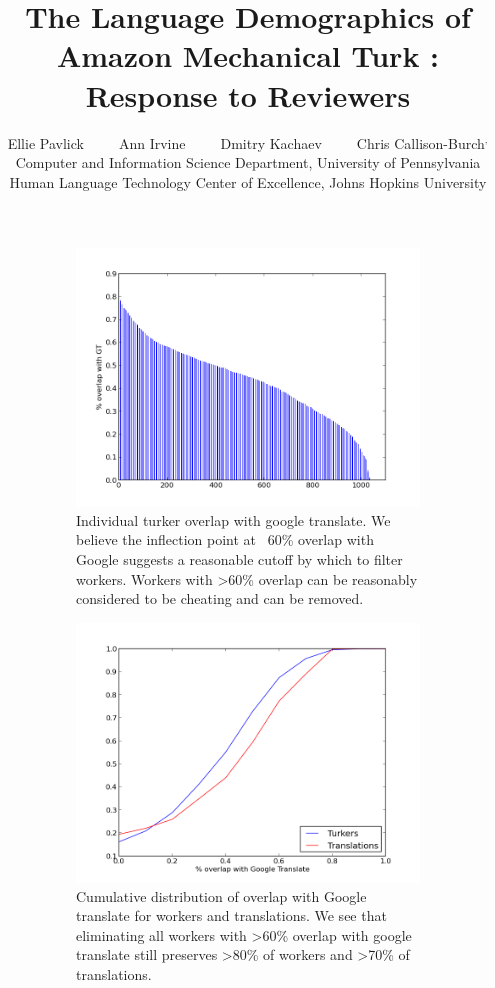 \documentclass[11pt]{article}
\title{The Language Demographics of  Amazon Mechanical Turk : Response  to Reviewers}
\author{Ellie Pavlick\affliationPenn \ \ \ \ \ Ann Irvine\affliationJHU  \ \ \ \ \ Dmitry Kachaev\affliationJHU  \ \ \ \ \  Chris Callison-Burch\affliationPenn$^{,}$\affliationJHU \\
\affliationPenn Computer and Information Science Department, University of Pennsylvania \\
\affliationJHU Human Language Technology Center of Excellence, Johns Hopkins University \\
  }
\author{}
\date{}
\begin{document}
\maketitle

\begin{figure}
\centering
\begin{subfigure}[b]{1\linewidth}
\includegraphics[width=\textwidth]{figures/turker-googmatch-distribution.png}
\caption{Individual turker overlap with google translate. We believe the inflection point at ~60\% overlap with Google suggests a reasonable cutoff by which to filter workers. Workers with \textgreater 60\% overlap can be reasonably considered to be cheating and can be removed.}                
\label{dist}
\end{subfigure}
\begin{subfigure}[b]{1\linewidth}
\includegraphics[width=\textwidth]{figures/google-cdf-googlangs.png}
\caption{Cumulative distribution of overlap with Google translate for workers and translations. We see that eliminating all workers with \textgreater 60\% overlap with google translate still preserves \textgreater 80\% of workers and \textgreater 70\% of translations.}
\label{cdf}
\end{subfigure}
\caption{}\label{cheaters}
\end{figure}
\end{document}
